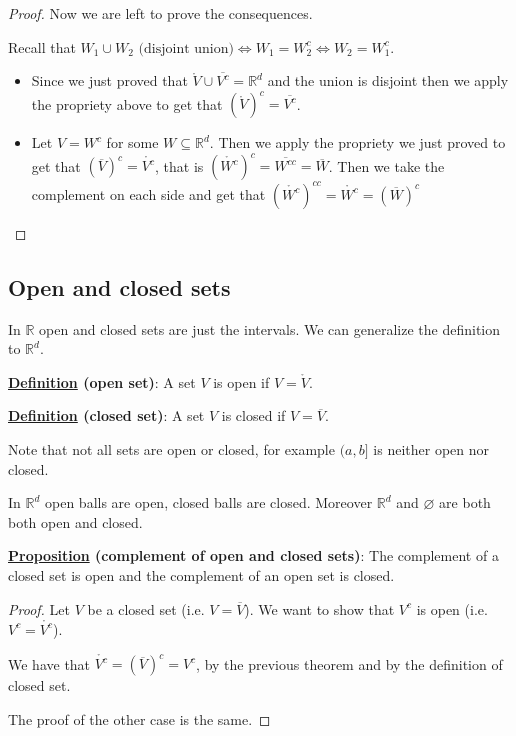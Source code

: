 \documentclass[10pt]{extarticle}
\newcommand{\R}{\mathbb{R}}
\begin{document}
\begin{proof}
                    Now we are left to prove the consequences.

                    Recall that $W_1 \cup W_2 \text{ (disjoint union)} \iff W_1 = W_2^c \iff W_2 = W_1^c$.

                    \begin{itemize}
                        \item Since we just proved that $\mathring{V} \cup \overline{V^c} = \R^d$ and the union is disjoint then we apply the propriety above to get that $\left(\mathring{V}\right)^c = \overline{V^c}$.
                        \item Let $V = W^c$ for some $W \subseteq \R^d$.
                              Then we apply the propriety we just proved to get that $\left(\overline{V}\right)^c = \mathring{V^c}$, that is $\left(\mathring{W^c}\right)^c = \overline{W^{cc}} = \overline{W}$.
                              Then we take the complement on each side and get that $\left(\mathring{W^c}\right)^{cc} = \mathring{W^c} = \left(\overline{W}\right)^c$
                    \end{itemize}
                \end{proof}

                \subsection{Open and closed sets}

                In $\R$ open and closed sets are just the intervals. We can generalize the definition to $\R^d$.

                \textbf{\underline{Definition} (open set)}: A set $V$ is open if $V = \mathring{V}$.

                \textbf{\underline{Definition} (closed set)}: A set $V$ is closed if $V = \overline{V}$.

                Note that not all sets are open or closed, for example $(a, b]$ is neither open nor closed.

In $\R^d$ open balls are open, closed balls are closed.
Moreover $\R^d$ and $\varnothing$ are both both open and closed.

\textbf{\underline{Proposition} (complement of open and closed sets)}:
The complement of a closed set is open and the complement of an open set is closed.

\begin{proof}
    Let $V$ be a closed set (i.e. $V = \overline{V}$).
    We want to show that $V^c$ is open (i.e. $V^c = \mathring{V^c}$).

    We have that $\mathring{V^c} = \left(\overline{V}\right)^c = V^c$, by the previous theorem and by the definition of closed set.

    The proof of the other case is the same.
\end{proof}
\end{document}
